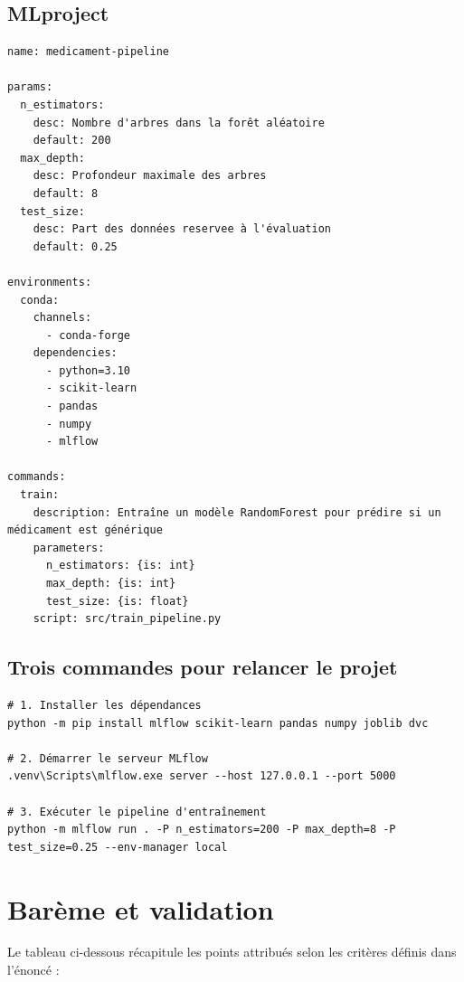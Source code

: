 \documentclass[12pt,a4paper]{report}
\begin{document}
\section{MLproject}
\begin{verbatim}
name: medicament-pipeline

params:
  n_estimators:
    desc: Nombre d'arbres dans la forêt aléatoire
    default: 200
  max_depth:
    desc: Profondeur maximale des arbres
    default: 8
  test_size:
    desc: Part des données reservee à l'évaluation
    default: 0.25

environments:
  conda:
    channels:
      - conda-forge
    dependencies:
      - python=3.10
      - scikit-learn
      - pandas
      - numpy
      - mlflow

commands:
  train:
    description: Entraîne un modèle RandomForest pour prédire si un médicament est générique
    parameters:
      n_estimators: {is: int}
      max_depth: {is: int}
      test_size: {is: float}
    script: src/train_pipeline.py
\end{verbatim}

\section{Trois commandes pour relancer le projet}
\begin{verbatim}
# 1. Installer les dépendances
python -m pip install mlflow scikit-learn pandas numpy joblib dvc

# 2. Démarrer le serveur MLflow
.venv\Scripts\mlflow.exe server --host 127.0.0.1 --port 5000

# 3. Exécuter le pipeline d'entraînement
python -m mlflow run . -P n_estimators=200 -P max_depth=8 -P test_size=0.25 --env-manager local
\end{verbatim}

\chapter*{Barème et validation}

Le tableau ci-dessous récapitule les points attribués selon les critères définis dans l'énoncé :
\end{document}
